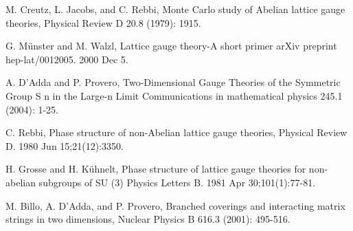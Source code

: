 \documentclass[9pt,twocolumn,twoside]{article}
\begin{document}

\begin{thebibliography}{9}

	M. Creutz, L. Jacobs, and C. Rebbi, 
	Monte Carlo study of Abelian lattice gauge theories, 
	Physical Review D 20.8 (1979): 1915.

	G. Münster and M. Walzl,
	Lattice gauge theory-A short primer
	arXiv preprint hep-lat/0012005. 2000 Dec 5.

	A. D’Adda and P. Provero,
	Two-Dimensional Gauge Theories of the Symmetric Group S n in the Large-n Limit
	Communications in mathematical physics 245.1 (2004): 1-25.

	C. Rebbi,
	Phase structure of non-Abelian lattice gauge theories,
	Physical Review D. 1980 Jun 15;21(12):3350.

	H. Grosse and H. Kühnelt,
	Phase structure of lattice gauge theories for non-abelian subgroups of SU (3)
	Physics Letters B. 1981 Apr 30;101(1):77-81.

	M. Billo, A. D'Adda, and P. Provero,
	Branched coverings and interacting matrix strings in two dimensions,
	Nuclear Physics B 616.3 (2001): 495-516.


\end{thebibliography}
\end{document}

